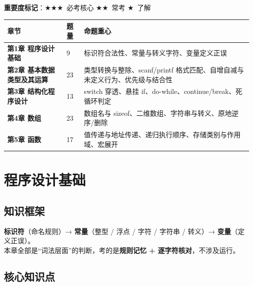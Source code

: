 \documentclass[UTF8,zihao=-4,a4paper]{ctexart}
\newcommand{\cstar}{\textcolor{deepred}{$\bigstar$}}
\begin{document}
\textbf{重要度标记}：\cstar\cstar\cstar\ 必考核心 \quad \cstar\cstar\ 常考 \quad \cstar\ 了解

\vspace{4pt}
\begin{center}
\footnotesize
\begin{tabularx}{\linewidth}{>{\bfseries}p{4.4cm} p{1.1cm} X}
\toprule
章节 & 题量 & 命题重心\\
\midrule
第1章 程序设计基础 & 9 & 标识符合法性、常量与转义字符、变量定义正误\\
第2章 基本数据类型及其运算 & 23 & 类型转换与整除、scanf/printf 格式匹配、自增自减与未定义行为、优先级与结合性\\
第3章 结构化程序设计 & 13 & switch 穿透、悬挂 if、do-while、continue/break、死循环判定\\
第4章 数组 & 23 & 数组名与 sizeof、二维数组、字符串与转义、原地逆序/删除\\
第5章 函数 & 17 & 值传递与地址传递、递归执行顺序、存储类别与作用域、宏展开\\
\bottomrule
\end{tabularx}
\end{center}

\newpage

\section{程序设计基础}

\subsection{知识框架}

\begin{keybox}[本章脉络]
\textbf{标识符}（命名规则）→ \textbf{常量}（整型 / 浮点 / 字符 / 字符串 / 转义）→ \textbf{变量}（定义正误）。\\
本章全部是“词法层面”的判断，考的是\textbf{规则记忆 + 逐字符核对}，不涉及运行。
\end{keybox}

\subsection{核心知识点}
\end{document}
